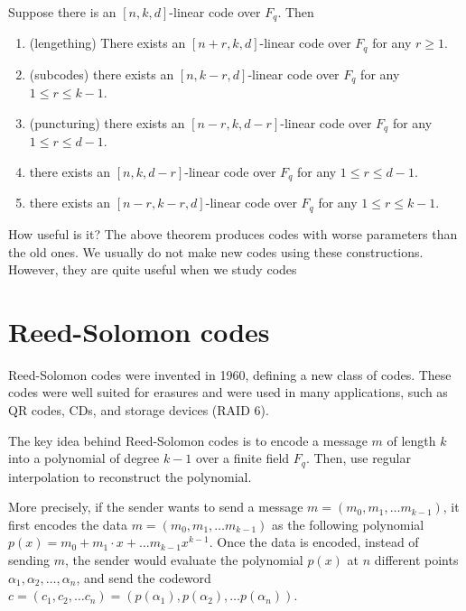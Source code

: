\begin{theorem}
    Suppose there is an $[n, k, d]$-linear code over $F_q$. Then
    \begin{enumerate}
        \item (lengething) There exists an $[n + r, k, d]$-linear code over 
        $F_q$ for any $r \ge 1$.

        \item (subcodes) there exists an $[n, k-r, d]$-linear code over $F_q$ for any 
        $1 \le r \le k- 1$.

        \item (puncturing) there exists an $[n- r, k, d- r]$-linear code over $F_q$ for any
        $1 \le r \le d- 1$.

        \item there exists an $[n, k, d- r]$-linear code over
         $F_q$ for any $1 \le r \le d- 1$.
        
        \item there exists an $[n- r, k- r, d]$-linear code over
         $F_q$ for any $1 \le r \le k- 1$.
    \end{enumerate}
\end{theorem}

\begin{bclogo}[couleur=blue!10, arrondi=0.1, logo=\bcinfo]{How useful is it?}
The above theorem produces codes with worse
parameters than the old ones. We usually do not make new codes using these
constructions. However, they are quite useful when we study codes
\end{bclogo}


\section{Reed-Solomon codes}
Reed-Solomon codes were invented in 1960, defining a new class 
of codes. These codes were well suited for erasures and were used in
many applications, such as QR codes, CDs, and storage devices (RAID 6).

The key idea behind Reed-Solomon codes is to encode a message $m$ of length $k$
into a polynomial of degree $k-1$ over a finite field $F_q$. Then, use regular interpolation 
to reconstruct the polynomial.

More precisely, if the sender wants to send a message $m=(m_0, m_1 ,\dots m_{k-1})$,
it first encodes the data $m=(m_0, m_1 ,\dots m_{k-1})$ as the following polynomial
$ p(x)=m_0 +m_1 \cdot x + \dots m_{k-1}x ^{k-1}$.
Once the data is encoded, instead of sending $m$, the sender would 
evaluate the polynomial $p(x)$ at $n$ different points $\alpha_1,\alpha_2,\dots,\alpha_n$,
and send the codeword $c=(c_1,c_2,\dots c_n) =(p(\alpha_1), p(\alpha_2),\dots p(\alpha_n))$.

